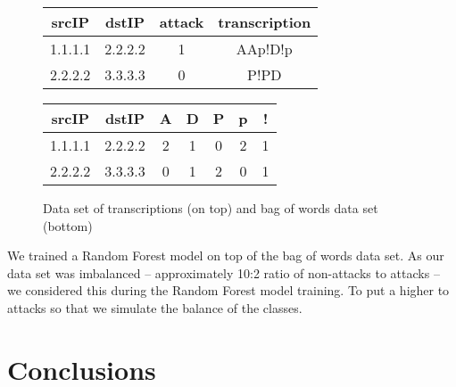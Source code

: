 \documentclass{article}
\begin{document}
\begin{figure}[h!]
\centering
\begin{tabular}{ |c|c|c|c| }
 \hline
 srcIP & dstIP & attack & transcription \\
 \hline
 1.1.1.1 & 2.2.2.2 & 1 & AAp!D!p \\
 2.2.2.2 & 3.3.3.3 & 0 & P!PD \\
 \hline
\end{tabular}

\vspace{0.3cm}

\begin{tabular}{ |c|c|c|c|c|c|c| }
 \hline
 srcIP & dstIP & A & D & P & p & ! \\
 \hline
 1.1.1.1 & 2.2.2.2 & 2 & 1 & 0 & 2 & 1 \\
 2.2.2.2 & 3.3.3.3 & 0 & 1 & 2 & 0 & 1 \\
 \hline
\end{tabular}
\caption{Data set of transcriptions (on top) and bag of words data set (bottom)}
\label{fig-bag-of-words-example}
\end{figure}

We trained a Random Forest model on top of the bag of words data set. As our data set was imbalanced -- approximately 10:2 ratio of non-attacks to attacks -- we considered this during the Random Forest model training. To put a higher to attacks so that we simulate the balance of the classes.




\section{Conclusions}








% 







\end{document}
